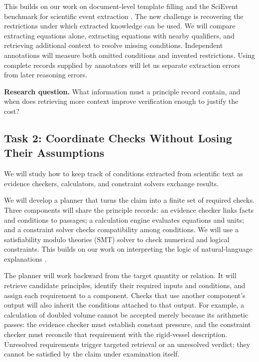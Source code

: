 \documentclass[12pt]{article}
\begin{document}
This builds on our work on document-level template filling \citep{du2021gtt} and the SciEvent benchmark for scientific event extraction \citep{dong2025scievent}. The new challenge is recovering the restrictions under which extracted knowledge can be used. We will compare extracting equations alone, extracting equations with nearby qualifiers, and retrieving additional context to resolve missing conditions. Independent annotations will measure both omitted conditions and invented restrictions. Using complete records supplied by annotators will let us separate extraction errors from later reasoning errors.

\textbf{Research question.} What information must a principle record contain, and when does retrieving more context improve verification enough to justify the cost?

\subsection*{Task 2: Coordinate Checks Without Losing Their Assumptions}

We will study how to keep track of conditions extracted from scientific text as evidence checkers, calculators, and constraint solvers exchange results.

We will develop a planner that turns the claim into a finite set of required checks. Three components will share the principle records: an evidence checker links facts and conditions to passages; a calculation engine evaluates equations and units; and a constraint solver checks compatibility among conditions. We will use a satisfiability modulo theories (SMT) solver to check numerical and logical constraints. This builds on our work on interpreting the logic of natural-language explanations \citep{han2023clore}.

The planner will work backward from the target quantity or relation. It will retrieve candidate principles, identify their required inputs and conditions, and assign each requirement to a component. Checks that use another component's output will also inherit the conditions attached to that output. For example, a calculation of doubled volume cannot be accepted merely because its arithmetic passes: the evidence checker must establish constant pressure, and the constraint checker must reconcile that requirement with the rigid-vessel description. Unresolved requirements trigger targeted retrieval or an unresolved verdict; they cannot be satisfied by the claim under examination itself.
\end{document}
